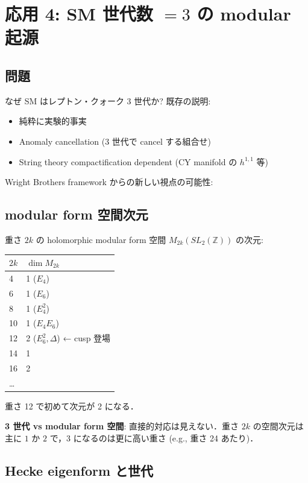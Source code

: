 \documentclass[11pt,a4paper]{article}
\begin{document}
\section{応用 4: SM 世代数 $= 3$ の modular 起源}

\subsection{問題}

なぜ SM はレプトン・クォーク 3 世代か? 既存の説明:
\begin{itemize}
\item 純粋に実験的事実
\item Anomaly cancellation (3 世代で cancel する組合せ)
\item String theory compactification dependent (CY manifold の $h^{1,1}$ 等)
\end{itemize}

Wright Brothers framework からの新しい視点の可能性:

\subsection{modular form 空間次元}

重さ $2k$ の holomorphic modular form 空間 $M_{2k}(SL_2(\mathbb{Z}))$
の次元:
\begin{center}
\begin{tabular}{ll}
\toprule
$2k$ & $\dim M_{2k}$ \\
\midrule
4 & 1 ($E_4$) \\
6 & 1 ($E_6$) \\
8 & 1 ($E_4^2$) \\
10 & 1 ($E_4 E_6$) \\
12 & 2 ($E_6^2, \Delta$) ← cusp 登場 \\
14 & 1 \\
16 & 2 \\
\ldots & \\
\bottomrule
\end{tabular}
\end{center}

重さ 12 で初めて次元が 2 になる．

\textbf{3 世代 vs modular form 空間}: 直接的対応は見えない．重さ $2k$
の空間次元は主に $1$ か $2$ で，3 になるのは更に高い重さ (e.g.,
重さ 24 あたり)．

\subsection{Hecke eigenform と世代}
\end{document}
